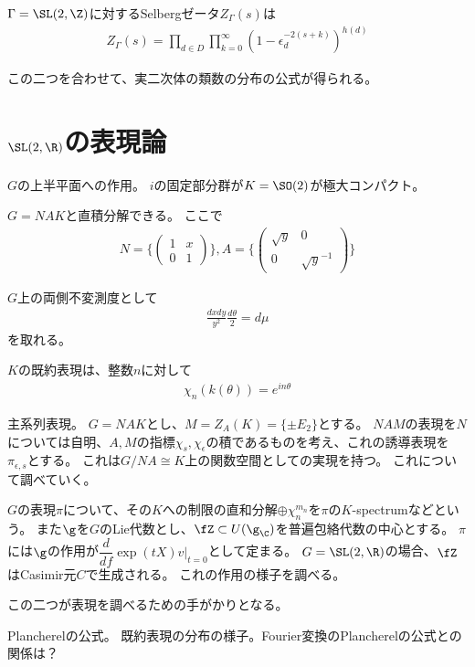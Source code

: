 \documentclass{jsarticle}
\begin{document}
\begin{thm}[数論的表示]
$\Gamma=\SL(2,\Z)$に対するSelbergゼータ$Z_\Gamma(s)$は
\begin{align*}
Z_\Gamma(s)=\prod_{d\in D}\prod^\infty_{k=0}(1-\epsilon_d^{-2(s+k)})^{h(d)}
\end{align*}
\end{thm}

この二つを合わせて、実二次体の類数の分布の公式が得られる。




\section{$\SL(2,\R)$の表現論}
$G$の上半平面への作用。
$i$の固定部分群が$K=\SO(2)$が極大コンパクト。

$G=NAK$と直積分解できる。
ここで
\begin{align*}
N=\{\begin{pmatrix}1&x\\0&1\end{pmatrix}\}, A=\{\begin{pmatrix}\sqrt{y}&0\\0&\sqrt{y}^{-1}\end{pmatrix}\}
\end{align*}

$G$上の両側不変測度として
\begin{align*}
\frac{dxdy}{y^2}\frac{d\theta}{2}=d\mu
\end{align*}
を取れる。

$K$の既約表現は、整数$n$に対して
\begin{align*}
\chi_n(k(\theta))=e^{in\theta}
\end{align*}

主系列表現。
$G=NAK$とし、$M=Z_A(K)=\{\pm E_2\}$とする。
$NAM$の表現を$N$については自明、$A, M$の指標$\chi_s, \chi_\epsilon$の積であるものを考え、これの誘導表現を$\pi_{\epsilon,s}$とする。
これは$G/NA\cong K$上の関数空間としての実現を持つ。
これについて調べていく。

$G$の表現$\pi$について、その$K$への制限の直和分解$\oplus \chi_n^{m_n}$を$\pi$の$K$-spectrumなどという。
また$\g$を$G$のLie代数とし、$\fZ\subset U(\g_\C)$を普遍包絡代数の中心とする。
$\pi$には$\g$の作用が$\dfrac{d}{df}\exp(tX)v\vert_{t=0}$として定まる。
$G=\SL(2,\R)$の場合、$\fZ$はCasimir元$C$で生成される。
これの作用の様子を調べる。

この二つが表現を調べるための手がかりとなる。

Plancherelの公式。
既約表現の分布の様子。Fourier変換のPlancherelの公式との関係は？
\end{document}

